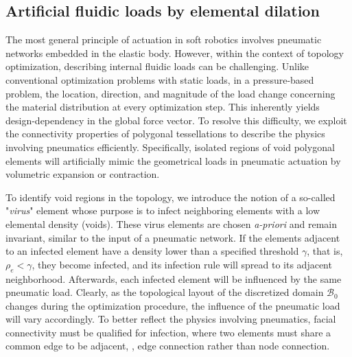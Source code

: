 \subsection{Artificial fluidic loads by elemental dilation}
The most general principle of actuation in soft robotics involves pneumatic networks embedded in the elastic body. However, within the context of topology optimization, describing internal fluidic loads can be challenging. Unlike conventional optimization problems with static loads, in a pressure-based problem, the location, direction, and magnitude of the load change concerning the material distribution at every optimization step. This inherently yields design-dependency in the global force vector. To resolve this difficulty, we exploit the connectivity properties of polygonal tessellations to describe the physics involving pneumatics efficiently. Specifically, isolated regions of void polygonal elements will artificially mimic the geometrical loads in pneumatic actuation by volumetric expansion or contraction.

To identify void regions in the topology, we introduce the notion of a so-called "\emph{virus}" element whose purpose is to infect neighboring elements with a low elemental density (voids). These virus elements are chosen \textit{a-priori} and remain invariant, similar to the input of a pneumatic network. If the elements adjacent to an infected element have a density lower than a specified threshold $\gamma$, that is, $\rho_e < \gamma$, they become infected, and its infection rule will spread to its adjacent neighborhood. Afterwards, each infected element will be influenced by the same pneumatic load. Clearly, as the topological layout of the discretized domain $\mathcal{B}_0$ changes during the optimization procedure, the influence of the pneumatic load will vary accordingly. To better reflect the physics involving pneumatics, facial connectivity must be qualified for infection, where two elements must share a common edge to be adjacent, \ie, edge connection rather than node connection.


